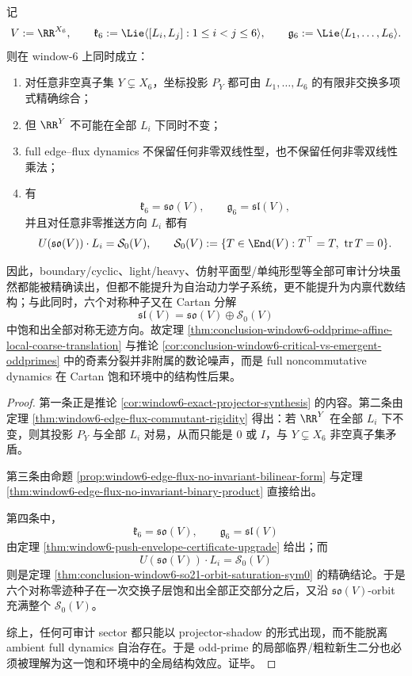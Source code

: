 \begin{theorem}\label{thm:conclusion-window6-observable-sectors-vs-cartan-saturated-ambient}
记
\[
V:=\RR^{X_6},
\qquad
\mathfrak k_6:=\Lie\langle [L_i,L_j]:1\le i<j\le 6\rangle,
\qquad
\mathfrak g_6:=\Lie\langle L_1,\dots,L_6\rangle.
\]
则在 window-\(6\) 上同时成立：
\begin{enumerate}
  \item 对任意非空真子集 \(Y\subsetneq X_6\)，坐标投影 \(P_Y\) 都可由 \(L_1,\dots,L_6\) 的有限非交换多项式精确综合；
  \item 但 \(\RR^Y\) 不可能在全部 \(L_i\) 下同时不变；
  \item full edge--flux dynamics 不保留任何非零双线性型，也不保留任何非零双线性乘法；
  \item 有
  \[
  \mathfrak k_6=\mathfrak{so}(V),
  \qquad
  \mathfrak g_6=\mathfrak{sl}(V),
  \]
  并且对任意非零推送方向 \(L_i\) 都有
  \[
  U(\mathfrak{so}(V))\cdot L_i=\mathcal S_0(V),
  \qquad
  \mathcal S_0(V):=\{T\in\End(V):T^\top=T,\ \operatorname{tr}T=0\}.
  \]
\end{enumerate}
因此，boundary/cyclic、light/heavy、仿射平面型/单纯形型等全部可审计分块虽然都能被精确读出，但都不能提升为自治动力学子系统，更不能提升为内禀代数结构；与此同时，六个对称种子又在 Cartan 分解
\[
\mathfrak{sl}(V)=\mathfrak{so}(V)\oplus \mathcal S_0(V)
\]
中饱和出全部对称无迹方向。故定理 \ref{thm:conclusion-window6-oddprime-affine-local-coarse-translation} 与推论 \ref{cor:conclusion-window6-critical-vs-emergent-oddprimes} 中的奇素分裂并非附属的数论噪声，而是 full noncommutative dynamics 在 Cartan 饱和环境中的结构性后果。
\end{theorem}
\begin{proof}
第一条正是推论 \ref{cor:window6-exact-projector-synthesis} 的内容。第二条由定理 \ref{thm:window6-edge-flux-commutant-rigidity} 得出：若 \(\RR^Y\) 在全部 \(L_i\) 下不变，则其投影 \(P_Y\) 与全部 \(L_i\) 对易，从而只能是 \(0\) 或 \(I\)，与 \(Y\subsetneq X_6\) 非空真子集矛盾。

第三条由命题 \ref{prop:window6-edge-flux-no-invariant-bilinear-form} 与定理 \ref{thm:window6-edge-flux-no-invariant-binary-product} 直接给出。

第四条中，
\[
\mathfrak k_6=\mathfrak{so}(V),
\qquad
\mathfrak g_6=\mathfrak{sl}(V)
\]
由定理 \ref{thm:window6-push-envelope-certificate-upgrade} 给出；而
\[
U(\mathfrak{so}(V))\cdot L_i=\mathcal S_0(V)
\]
则是定理 \ref{thm:conclusion-window6-so21-orbit-saturation-sym0} 的精确结论。于是六个对称零迹种子在一次交换子层饱和出全部正交部分之后，又沿 \(\mathfrak{so}(V)\)-orbit 充满整个 \(\mathcal S_0(V)\)。

综上，任何可审计 sector 都只能以 projector-shadow 的形式出现，而不能脱离 ambient full dynamics 自治存在。于是 odd-prime 的局部临界/粗粒新生二分也必须被理解为这一饱和环境中的全局结构效应。证毕。
\end{proof}

